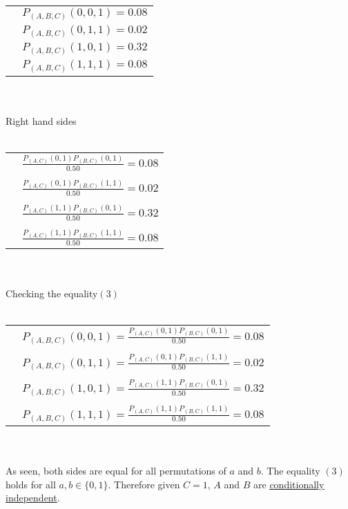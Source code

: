 \documentclass[12pt]{article}
\begin{document}
\begin{tabular}{l l}
    & $P_{(A,B,C)}(0,0,1)=0.08$\\
    & $P_{(A,B,C)}(0,1,1)=0.02$\\
    & $P_{(A,B,C)}(1,0,1)=0.32$\\
    & $P_{(A,B,C)}(1,1,1)=0.08$\\
\end{tabular}
\\ \\
Right hand sides
\\ \\
\begin{tabular}{l l}
    & $\frac{P_{(A,C)}(0,1)P_{(B,C)}(0,1)}{0.50}=0.08$\\
    & \\
    & $\frac{P_{(A,C)}(0,1)P_{(B,C)}(1,1)}{0.50}=0.02$\\
    & \\
    & $\frac{P_{(A,C)}(1,1)P_{(B,C)}(0,1)}{0.50}=0.32$\\
    & \\
    & $\frac{P_{(A,C)}(1,1)P_{(B,C)}(1,1)}{0.50}=0.08$\\
\end{tabular}
\\ \\
Checking the equality\hyperlink{eq3}{$(3)$}
\\ \\
\begin{tabular}{l l}
    & $P_{(A,B,C)}(0,0,1)=\frac{P_{(A,C)}(0,1)P_{(B,C)}(0,1)}{0.50}=0.08$\\
    &\\
    & $P_{(A,B,C)}(0,1,1)=\frac{P_{(A,C)}(0,1)P_{(B,C)}(1,1)}{0.50}=0.02$\\
    &\\
    & $P_{(A,B,C)}(1,0,1)=\frac{P_{(A,C)}(1,1)P_{(B,C)}(0,1)}{0.50}=0.32$\\
    &\\
    & $P_{(A,B,C)}(1,1,1)=\frac{P_{(A,C)}(1,1)P_{(B,C)}(1,1)}{0.50}=0.08$\\
\end{tabular}
\\ \\
As seen, both sides are equal for all permutations of $a$ and $b$. The equality \hyperlink{eq3}{$(3)$} holds for all $a, b \in \{0,1\}$. Therefore 
given $C=1$, $A$ and $B$ are \underline{\underline{conditionally independent}}.
\end{document}

